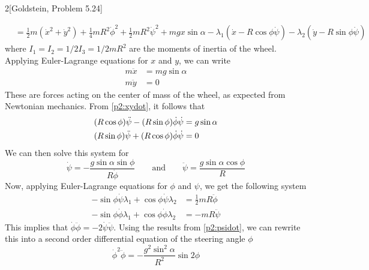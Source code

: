 \documentclass[12pt]{article}
\begin{document}
\begin{problem}{2}[Goldstein, Problem 5.24]
\begin{solution}
\begin{align}
       &=\frac12m(\dot{x}^2+\dot{y}^2)+\frac14mR^2\dot\phi^2+\frac12mR^2\dot\psi^2+mgx\sin\alpha-\lambda_1(\dot{x}-R\cos\phi\dot\psi)-\lambda_2(\dot{y}-R\sin\phi\dot\psi)
\end{align}
where $I_1=I_2=1 /2I_3=1 /2mR^2$ are the moments of inertia of the wheel. Applying 
Euler-Lagrange equations for $x$ and $y$, we can write
\begin{subequations}
    \begin{align}
        m\ddot{x}&=mg\sin\alpha\\
        m\ddot{y}&=0
    \end{align} 
\end{subequations}
These are forces acting on the center of mass of the wheel, as expected
from Newtonian mechanics. From \eqref{p2:xydot}, it follows that
\begin{subequations}
    \begin{align}
        \qty(R\cos\phi)\ddot\psi-\qty(R\sin\phi)\dot{\phi}\dot\psi&=g\sin\alpha\\
        \qty(R\sin\phi)\ddot\psi+\qty(R\cos\phi)\dot\phi\dot\psi&=0
    \end{align} 
\end{subequations}
We can then solve this system for
\begin{equation}\label{p2:psidot}
    \dot\psi=-\frac{g\sin\alpha\sin\phi}{R\dot{\phi}}
    \qquad\text{and}\qquad
    \ddot\psi=\frac{g\sin\alpha\cos\phi}{R}
\end{equation}
Now, applying Euler-Lagrange equations for $\phi$ and $\psi$, we get the
following system
\begin{subequations}
    \begin{align}
        -\sin\phi\dot\psi\lambda_1+\cos\phi\dot\psi\lambda_2&=\frac12mR\ddot{\phi}
        \label{p2:phidd1}\\
        -\sin\phi\dot\phi\lambda_1+\cos\phi\dot\phi\lambda_2&=-mR\ddot\psi
    \end{align} 
\end{subequations}
This implies that $\dot\phi\ddot\phi=-2\dot\psi\ddot\psi$. Using the results
from \eqref{p2:psidot}, we can rewrite this into a second order differential
equation of the steering angle $\phi$
\begin{equation}
    \dot\phi^2\ddot\phi=-\frac{g^2\sin^2\alpha}{R^2} \sin2\phi
\end{equation}
\end{solution}
\end{problem}
\end{document}
